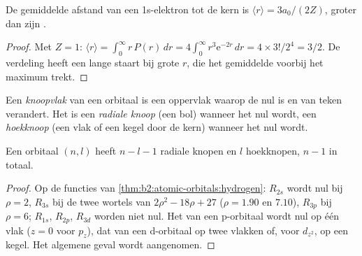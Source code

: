 \begin{proposition}\label{prop:b2:atomic-orbitals:mean-radius}
De gemiddelde afstand van een 1s-elektron tot de kern is $\langle r\rangle = 3a_0/(2Z)$,
groter dan zijn .
\end{proposition}

\begin{proof}
Met $Z = 1$: $\langle r\rangle = \int_0^\infty r\,P(r)\,dr = 4\int_0^\infty r^3\mathrm e^{-2r}
\,dr = 4 \times 3!/2^4 = 3/2$. De verdeling heeft een lange staart bij grote $r$,
die het gemiddelde voorbij het maximum trekt.
\end{proof}

\begin{definition}[Knopen]\label{def:b2:atomic-orbitals:node}
Een \emph{knoopvlak} van een orbitaal is een oppervlak waarop
de  nul is en van teken verandert. Het is een \emph{radiale knoop}
(een bol) wanneer het  nul wordt, een
\emph{hoekknoop} (een vlak of een kegel door de kern) wanneer het 
nul wordt.
\end{definition}

\begin{proposition}\label{prop:b2:atomic-orbitals:nodes}
Een orbitaal $(n, l)$ heeft $n - l - 1$ radiale knopen en $l$ hoekknopen, $n - 1$ in
totaal.
\end{proposition}

\begin{proof}
Op de functies van \cref{thm:b2:atomic-orbitals:hydrogen}: $R_{2s}$ wordt nul bij
$\rho = 2$, $R_{3s}$ bij de twee wortels van $2\rho^2 - 18\rho + 27$ ($\rho = 1.90$ en $7.10$),
$R_{3p}$ bij $\rho = 6$; $R_{1s}$, $R_{2p}$, $R_{3d}$ worden niet nul. Het 
van een p-orbitaal wordt nul op één vlak ($z = 0$ voor $p_z$), dat van een d-orbitaal op twee
vlakken of, voor $d_{z^2}$, op een kegel. Het algemene geval wordt aangenomen.
\end{proof}

